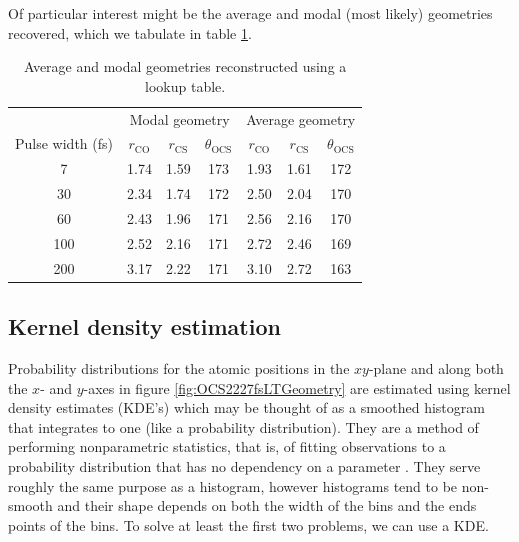 Of particular interest might be the average and modal (most likely) geometries recovered, which we tabulate in table \ref{table:lookupTableGeometries}.

\begin{table}
  \myfloatalign
  \centering
  \begin{tabularx}{0.9\textwidth}{ccccccc}
    \toprule
    & \multicolumn{3}{c}{Modal geometry} & \multicolumn{3}{c}{Average geometry} \\
    Pulse width (fs) & $r_\mathrm{CO}$ & $r_\mathrm{CS}$ & $\theta_\mathrm{OCS}$ & $r_\mathrm{CO}$ & $r_\mathrm{CS}$ & $\theta_\mathrm{OCS}$ \\
    \midrule
    7 & 1.74 & 1.59 & 173 & 1.93 & 1.61 & 172 \\
    30 & 2.34 & 1.74 & 172 & 2.50 & 2.04 & 170 \\
    60 & 2.43 & 1.96 & 171 & 2.56 & 2.16 & 170 \\
    100 & 2.52 & 2.16 & 171 & 2.72 & 2.46 & 169 \\
    200 & 3.17 & 2.22 & 171 & 3.10 & 2.72 & 163 \\
    \bottomrule
  \end{tabularx}
  \caption[Average and modal geometries reconstructed using a lookup table.]
  {Average and modal geometries reconstructed using a lookup table.}
  \label{table:lookupTableGeometries}
\end{table}

\subsection{Kernel density estimation} \label{sec:kde}
Probability distributions for the atomic positions in the $xy$-plane and along both the $x$- and $y$-axes in figure \ref{fig:OCS2227fsLTGeometry} are estimated using kernel density estimates (KDE's) which may be thought of as a smoothed histogram that integrates to one (like a probability distribution). They are a method of performing nonparametric statistics, that is, of fitting observations to a probability distribution that has no dependency on a parameter \citep[\S 20.2-20.3]{Kendall99}. They serve roughly the same purpose as a histogram, however histograms tend to be non-smooth and their shape depends on both the width of the bins and the ends points of the bins. To solve at least the first two problems, we can use a KDE.


